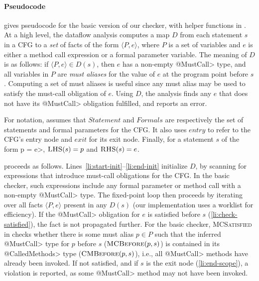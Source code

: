 \paragraph{Pseudocode}  gives pseudocode for the
basic version of our checker, with helper functions in .  At a
high level, the dataflow analysis computes a map $D$ from each statement $s$ in
a CFG to a \emph{set} of facts of the form $\langle P, e \rangle$, where $P$ is
a set of variables and $e$ is either a method call expression or a formal
parameter variable.  The meaning of $D$ is as follows: if $\langle P, e \rangle
\in D(s)$, then $e$ has a non-empty \<@MustCall> type, and all variables in $P$
are \emph{must aliases} for the value of $e$ at the program point before $s$.
Computing a set of must aliases is useful since any must alias may be used to
satisfy the must-call obligation of $e$.  Using $D$, the analysis finds any $e$
that does not have its \<@MustCall> obligation fulfilled, and reports an error.

For notation,  assumes that $\mathit{Statement}$
and $\mathit{Formals}$ are respectively the set of statements and formal
parameters for the CFG.  It also uses $\mathit{entry}$ to refer to the CFG's
entry node and $\mathit{exit}$ for its exit node.  Finally, for a statement $s$
of the form \<p = e>, $\textsc{LHS}(s) = p$ and $\textsc{RHS}(s) = e$.   

 proceeds as follows.
Lines~\ref{li:start-init}--\ref{li:end-init} initialize $D$, by scanning for
expressions that introduce must-call obligations for the CFG.  
In the basic checker, such expressions include any formal parameter or method
call with a non-empty \<@MustCall> type.  The fixed-point loop then proceeds by
iterating over all facts $\langle P, e \rangle$ present in any $D(s)$ (our
implementation uses a worklist for efficiency).  If the \<@MustCall> obligation
for $e$ is satisfied before $s$ (\cref{li:check-satisfied}), the fact is not
propagated further. For the basic checker, \textsc{MCSatisfied} in
 checks whether there is some must alias $p \in P$ such that
the inferred \<@MustCall> type for $p$ before $s$ ($\textsc{MCBefore}(p,s)$) is
contained in its \<@CalledMethods> type ($\textsc{CMBefore}(p,s)$), i.e., all
\<@MustCall> methods have already been invoked.  If not satisfied, and if $s$ is the exit node
(\cref{li:end-scope}), a violation is reported, as some \<@MustCall> method may
not have been invoked.

